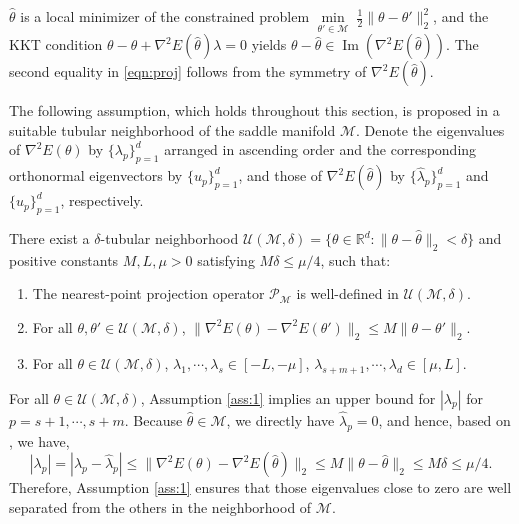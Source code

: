 \documentclass[final]{siamart251216}
\begin{document}
\begin{remark}
$\hat\theta$ is a local minimizer of the constrained problem $\min\limits_{\theta'\in\mathcal{M}}\;\tfrac12\|\theta-\theta'\|_2^2$, 
and the KKT condition 
$\theta-\hat\theta + \nabla^2 E(\hat\theta)\lambda = 0$
yields $\theta - \hat\theta \in \operatorname{Im}(\nabla^2 E(\hat\theta))$.
The second equality in \eqref{eqn:proj} follows from the symmetry of $\nabla^2 E(\hat\theta)$.
\end{remark}

The following assumption, which holds throughout this section, is proposed in a suitable tubular neighborhood of the saddle manifold $\mathcal{M}$.
Denote the eigenvalues of $\nabla^2 E(\theta)$ by $\{\lambda_p\}_{p=1}^{d}$ arranged in ascending order and the corresponding orthonormal eigenvectors by $\{u_p\}_{p=1}^d$, and those of $\nabla^2E(\hat{\theta})$ by $\{\hat{\lambda}_p\}_{p=1}^{d}$ and $\{\hat{u}_p\}_{p=1}^d$, respectively.
\begin{assumption}\label{ass:1}
There exist a $\delta$-tubular neighborhood $\mathcal{U}(\mathcal{M},\delta)=\{\theta\in \mathbb{R}^d:\|\theta-\hat{\theta}\|_2 < \delta\}$ and positive constants $M,L,\mu>0$ satisfying $M\delta \leqslant {\mu}/{4}$, such that:
\begin{enumerate}
\item [(i)] The nearest-point projection operator $\mathcal{P}_{\mathcal{M}}$ is well-defined in $\mathcal{U}(\mathcal{M},\delta)$.
\item [(ii)] For all $\theta, \theta' \in \mathcal{U}(\mathcal{M},\delta)$, $\|\nabla^2 E(\theta)-\nabla^2 E(\theta')\|_2\leqslant M\|\theta-\theta'\|_2$.
\item [(iii)] For all $\theta\in \mathcal{U}(\mathcal{M},\delta)$, 
$\lambda_1, \cdots, \lambda_s \in [-L, -\mu]$, 
$\lambda_{s+m+1}, \cdots, \lambda_{d} \in [\mu,L]$.
\end{enumerate}
\end{assumption}

\begin{remark}
For all $\theta\in \mathcal{U}(\mathcal{M},\delta)$,
Assumption \ref{ass:1} implies an upper bound for $|\lambda_p|$ for $p=s+1,\cdots,s+m$. 
Because $\hat{\theta}\in \mathcal{M}$, we directly have $\hat{\lambda}_{p}=0$, 
and hence, based on \cite[Theorem 8.1.5]{golub2013matrix}, we have,
\begin{equation*}
|\lambda_p|=|\lambda_p-\hat{\lambda}_p| \leqslant 
\|\nabla^2 E(\theta)-\nabla^2 E(\hat{\theta})\|_2 \leqslant 
M\|\theta-\hat{\theta}\|_2 \leqslant 
M\delta\leqslant {\mu}/{4}. 
\end{equation*}
Therefore, Assumption \ref{ass:1} ensures that those eigenvalues close to zero are well separated from the others in the neighborhood of $\mathcal{M}$. 
\label{re:asm}
\end{remark}
\end{document}
